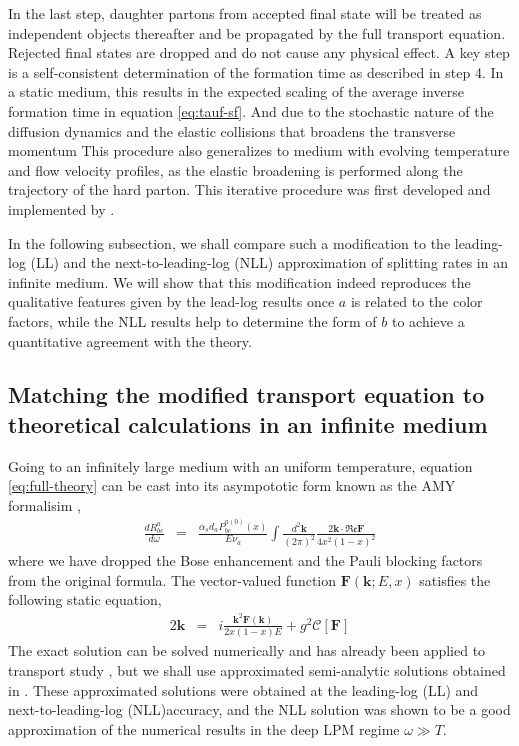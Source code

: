 \documentclass[aps, prc, reprint, amsmath, groupedaddress, nofootinbib]{revtex4-1}
\begin{document}
In the last step, daughter partons from accepted final state will be treated as independent objects thereafter and be propagated by the full transport equation.
Rejected final states are dropped and do not cause any physical effect. 
A key step is a self-consistent determination of the formation time as described in step 4. 
In a static medium, this results in the expected scaling of the average inverse formation time in equation \ref{eq:tauf-sf}.
And due to the stochastic nature of the diffusion dynamics and the elastic collisions that broadens the transverse momentum
This procedure also generalizes to medium with evolving temperature and flow velocity profiles, as the elastic broadening is performed along the trajectory of the hard parton.
This iterative procedure was first developed and implemented by \cite{Zapp:2011ya}.

In the following subsection, we shall compare such a modification to the leading-log (LL) and the next-to-leading-log (NLL) approximation of splitting rates in an infinite medium. 
We will show that this modification indeed reproduces the qualitative features given by the lead-log results once $a$ is related to the color factors, while the NLL results help to determine the form of $b$ to achieve a quantitative agreement with the theory.

\subsection{Matching the modified transport equation to theoretical calculations in an infinite medium}
Going to an infinitely large medium with an uniform temperature, equation \ref{eq:full-theory} can be cast into its asympototic form known as the AMY formalisim \cite{Arnold:2002ja,Arnold:2002zm,Arnold:2003zc},
\begin{eqnarray}\label{eq:AMY-1}
\frac{dR^a_{bc}}{d\omega} &=& \frac{\alpha_s d_a P^{a(0)}_{bc}(x)}{E\nu_a} \int\frac{d^2\mathbf{k}}{(2\pi)^2} \frac{2\mathbf{k}\cdot \mathfrak{Re} \mathbf{F}}{4x^2(1-x)^2}
\end{eqnarray}
where we have dropped the Bose enhancement and the Pauli blocking factors from the original formula.
The vector-valued function $\mathbf{F}(\mathbf{k}; E, x)$ satisfies the following static equation,
\begin{eqnarray}\label{eq:AMY-2}
2\mathbf{k} &=& i\frac{\mathbf{k}^2 \mathbf{F}(\mathbf{k})}{2x(1-x)E} + g^2 \mathcal{C}[\mathbf{F}]
\end{eqnarray} 
The exact solution can be solved numerically and has already been applied to transport study \cite{Jeon:2003gi,Schenke:2009gb}, but we shall use approximated semi-analytic solutions obtained in \cite{Arnold:2008zu}.
These approximated solutions were obtained at the leading-log (LL) and next-to-leading-log (NLL)accuracy, and the NLL solution was shown to be a good approximation of the numerical results in the deep LPM regime $\omega \gg T$.
\end{document}
